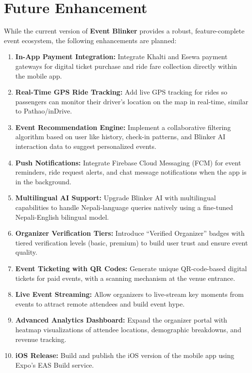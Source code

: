 \chapter{Future Enhancement}

While the current version of \textbf{Event Blinker} provides a robust, feature-complete event ecosystem, the following enhancements are planned:

\begin{enumerate}
    \item \textbf{In-App Payment Integration:} Integrate Khalti and Esewa payment gateways for digital ticket purchase and ride fare collection directly within the mobile app.
    
    \item \textbf{Real-Time GPS Ride Tracking:} Add live GPS tracking for rides so passengers can monitor their driver's location on the map in real-time, similar to Pathao/inDrive.
    
    \item \textbf{Event Recommendation Engine:} Implement a collaborative filtering algorithm based on user like history, check-in patterns, and Blinker AI interaction data to suggest personalized events.
    
    \item \textbf{Push Notifications:} Integrate Firebase Cloud Messaging (FCM) for event reminders, ride request alerts, and chat message notifications when the app is in the background.
    
    \item \textbf{Multilingual AI Support:} Upgrade Blinker AI with multilingual capabilities to handle Nepali-language queries natively using a fine-tuned Nepali-English bilingual model.
    
    \item \textbf{Organizer Verification Tiers:} Introduce ``Verified Organizer'' badges with tiered verification levels (basic, premium) to build user trust and ensure event quality.
    
    \item \textbf{Event Ticketing with QR Codes:} Generate unique QR-code-based digital tickets for paid events, with a scanning mechanism at the venue entrance.
    
    \item \textbf{Live Event Streaming:} Allow organizers to live-stream key moments from events to attract remote attendees and build event hype.
    
    \item \textbf{Advanced Analytics Dashboard:} Expand the organizer portal with heatmap visualizations of attendee locations, demographic breakdowns, and revenue tracking.
    
    \item \textbf{iOS Release:} Build and publish the iOS version of the mobile app using Expo's EAS Build service.
\end{enumerate}
